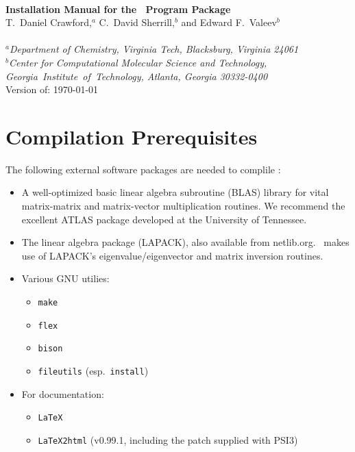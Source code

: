\documentclass[12pt]{article}
\begin{document}


\begin{center}
\ \\
\vspace{2.0in}
{\bf {\Large Installation Manual for the \PSIthree\ Program Package}} \\
\vspace{0.5in}
T.\ Daniel Crawford,$^a$ C.\ David Sherrill,$^b$ and Edward F.\ Valeev$^b$ \\
\ \\
{\em $^a$Department of Chemistry, Virginia Tech, Blacksburg, Virginia 24061} \\
\vspace{0.1in}
{\em $^b$Center for Computational Molecular Science and Technology, \mbox{Georgia 
Institute of Technology,} Atlanta, Georgia 30332-0400} 
\ \\
\vspace{0.3in}
Version of: \today
\end{center}

\thispagestyle{empty}

\newpage
\section{Compilation Prerequisites}

The following external software packages are needed to complile \PSIthree:
\begin{itemize}
\item A well-optimized basic linear algebra subroutine (BLAS) library
  for vital matrix-matrix and matrix-vector multiplication routines.
  We recommend the excellent ATLAS package developed at the University
  of Tennessee.  
\item The linear algebra package (LAPACK), also available from
  netlib.org.  \PSIthree\ makes use of LAPACK's eigenvalue/eigenvector
  and matrix inversion routines.  
\item Various GNU utilies: 
\begin{itemize}
\item {\tt make}
\item {\tt flex}
\item {\tt bison}
\item {\tt fileutils} (esp.\ {\tt install})
\end{itemize}
\item For documentation:
\begin{itemize}
\item {\tt LaTeX}
\item {\tt LaTeX2html} (v0.99.1, including the patch supplied with PSI3)
\end{itemize}
\end{itemize}
\end{document}
